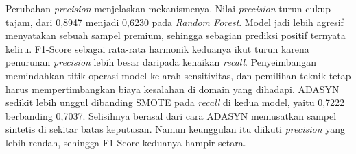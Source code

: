 \documentclass[a4paper,oneside,12pt]{report}
\begin{document}
Perubahan \textit{precision} menjelaskan mekanismenya. Nilai \textit{precision} turun cukup tajam, dari 0,8947 menjadi 0,6230 pada \textit{Random Forest}. Model jadi lebih agresif menyatakan sebuah sampel premium, sehingga sebagian prediksi positif ternyata keliru. F1-Score sebagai rata-rata harmonik keduanya ikut turun karena penurunan \textit{precision} lebih besar daripada kenaikan \textit{recall}. Penyeimbangan memindahkan titik operasi model ke arah sensitivitas, dan pemilihan teknik tetap harus mempertimbangkan biaya kesalahan di domain yang dihadapi. ADASYN sedikit lebih unggul dibanding SMOTE pada \textit{recall} di kedua model, yaitu 0,7222 berbanding 0,7037. Selisihnya berasal dari cara ADASYN memusatkan sampel sintetis di sekitar batas keputusan. Namun keunggulan itu diikuti \textit{precision} yang lebih rendah, sehingga F1-Score keduanya hampir setara.

\clearpage
\end{document}
